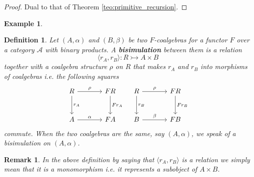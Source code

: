 \documentclass[letterpaper, 11pt, oneside]{memoir}
\theoremstyle{myteo}
\newtheorem{definition}[theorem]{Definition}
\newtheorem{example}[theorem]{Example}
\newtheorem{remark}[theorem]{Remark}
\numberwithin{equation}{section}
\newcommand{\marginnote}[1]{\marginpar{\footnotesize #1}}
\newcommand{\A}{\mathscr{A}}
\newcommand{\intoprod}[2]{{\langle #1, #2\rangle}}
\begin{document}
\begin{proof}
  Dual to that of Theorem \ref{teo:primitive_recursion}.
\end{proof}

\begin{example}
  
\end{example}

\begin{definition}
  \label{def:bisimulation}
  Let \((A, \alpha)\) and \((B, \beta)\) be two \(F\)-coalgebras for a functor \(F\) over a category \(\A\) with binary products.
  A \textbf{bisimulation} \marginnote{bisimulation} between them is a relation
  \begin{equation*}
    \intoprod{r_A}{r_B} : R \rightarrowtail A \times B
  \end{equation*}
  together with a coalgebra structure \(\rho\) on \(R\) that makes \(r_A\) and \(r_B\) into morphisms of coalgebras i.e. the following squares
  \begin{equation*}
    \begin{tikzcd}[sep = large]
      R \ar[r, "\rho"] \ar[d, "r_A"] & FR \ar[d, "Fr_A"] \\
      A \ar[r, "\alpha"] & FA
    \end{tikzcd}\quad
    \begin{tikzcd}[sep = large]
      R \ar[r, "\rho"] \ar[d, "r_B"] & FR \ar[d, "Fr_B"] \\
      B \ar[r, "\beta"] & FB
    \end{tikzcd}
  \end{equation*}
  commute.
  When the two coalgebras are the same, say \((A, \alpha)\), we speak of a bisimulation on \((A, \alpha)\).
\end{definition}

\begin{remark}
  In the above definition by saying that \(\intoprod{r_A}{r_B}\) is a relation we simply mean that it is a monomorphism i.e. it represents a subobject of \(A \times B\).
\end{remark}
\end{document}
